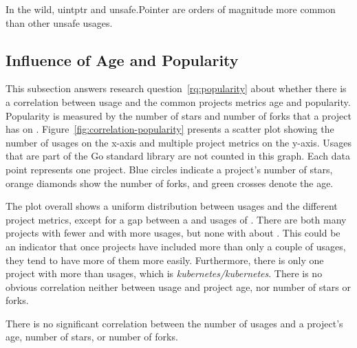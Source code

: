 \begin{answerToRQ}[\ref{rq:distTypes}]
    In the wild, uintptr and unsafe.Pointer are orders of magnitude more common than other unsafe usages.
\end{answerToRQ}



\subsection{Influence of Age and Popularity}\label{subsec:go-geiger:evaluation:popularity}

This subsection answers research question~\ref{rq:popularity} about whether there is a correlation between \unsafe{}
usage and the common projects metrics age and popularity.
Popularity is measured by the number of stars and number of forks that a project has on \github{}.
Figure~\ref{fig:correlation-popularity} presents a scatter plot showing the number of \unsafe{} usages on the x-axis and
multiple project metrics on the y-axis.
Usages that are part of the Go standard library are not counted in this graph.
Each data point represents one project.
Blue circles indicate a project's number of stars, orange diamonds show the number of forks, and green crosses denote
the age.



The plot overall shows a uniform distribution between \unsafe{} usages and the different project metrics, except for
a gap between a  and  usages of \unsafe{}.
There are both many projects with fewer and with more usages, but none with about .
This could be an indicator that once projects have included more than only a couple of \unsafe{} usages, they tend to
have more of them more easily.
Furthermore, there is only one project with more than  \unsafe{} usages, which is
\textit{kubernetes/kubernetes}.
There is no obvious correlation neither between \unsafe{} usage and project age, nor number of stars or forks.

\begin{answerToRQ}[\ref{rq:popularity}]
    There is no significant correlation between the number of \unsafe{} usages and a project's age, number of stars, or
    number of forks.
\end{answerToRQ}


